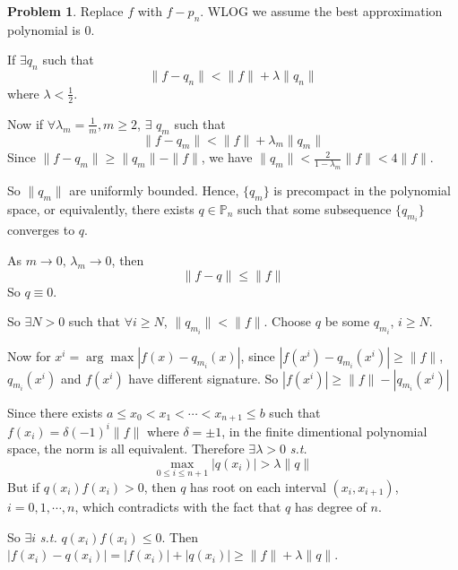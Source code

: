 \documentclass[a4paper]{article}
\theoremstyle{definition}
\newtheorem{problem}{Problem}
\theoremstyle{plain}
\newcommand{\Pbb}{\mathbb P}
\newcommand{\<}{\left<}
\renewcommand{\>}{\right>}
\numberwithin{equation}{problem}
\newcommand{\st}{ \textit{ s.t. }}
\begin{document}
\begin{problem}
    Replace  $ f $ with  $ f-p_n $. WLOG we assume the best approximation polynomial is 0.
    
    If  $ \exists q_n $ such that 
    \[\|f-q_n\|<\|f\|+\lambda\|q_n\|\]
    where  $ \lambda<\frac{1}{2} $.
    
    Now if  $ \forall \lambda_m=\frac{1}{m},m \geq 2 $,   $ \exists  $ $ q_m $ such that 
    \[\|f-q_m\|<\|f\|+\lambda_m\|q_m\|\]
    Since  $ \|f-q_m\| \geq \|q_m\|-\|f\| $, we have  $ \|q_m\|<\frac{2}{1-\lambda_m}\|f\|<4\|f\| $.
    
    So  $ \|q_m\| $ are uniformly bounded. Hence,  $ \{q_m\} $ is precompact in the polynomial space, or equivalently, there exists  $ q\in \Pbb_n $ such that some subsequence  $ \{q_{m_i}\} $ converges to  $ q $.
    
    As  $ m\rightarrow0,\,\lambda_m\rightarrow0 $, then 
    \[\|f-q\| \leq \|f\|\]
    So  $ q\equiv 0 $. 
    
    So  $ \exists N>0 $ such that  $ \forall i \geq N $,  $ \|q_{m_i}\|<\|f\| $. Choose  $ q $ be some  $ q_{m_i} $,  $ i \geq N $.   
    
    Now for  $ x^i=\arg\max|f(x)-q_{m_i}(x)| $, since  $ |f(x^i)-q_{m_i}(x^i)| \geq \|f\| $,  $ q_{m_i}(x^i) $ and  $ f(x^i) $  have  different signature. So  $ |f(x^i)| \geq \|f\|-|q_{m_i}(x^i)| $ 
    
    Since there exists  $ a \leq x_0<x_1<\cdots<x_{n+1} \leq b $  such that  $ f(x_i)=\delta(-1)^i\|f\| $ where  $ \delta=\pm 1 $, in the finite dimentional polynomial space, the norm is all equivalent. Therefore  $ \exists \lambda>0 $ \st 
    \[\max_{0 \leq i \leq n+1}|q(x_i)|>\lambda\|q\|\]
    But if   $ q(x_i)f(x_i)>0 $, then  $ q $ has root on each interval  $ (x_i,x_{i+1}) $,  $ i=0,1,\cdots,n $, which contradicts with the fact that  $ q  $ has degree of  $ n $.
    
    So  $ \exists i $ \st  $ q(x_i)f(x_i) \leq 0 $. Then  $ |f(x_i)-q(x_i)|=|f(x_i)|+|q(x_i)| \geq \|f\|+\lambda\|q\| $.

    
\end{problem}
\end{document}
